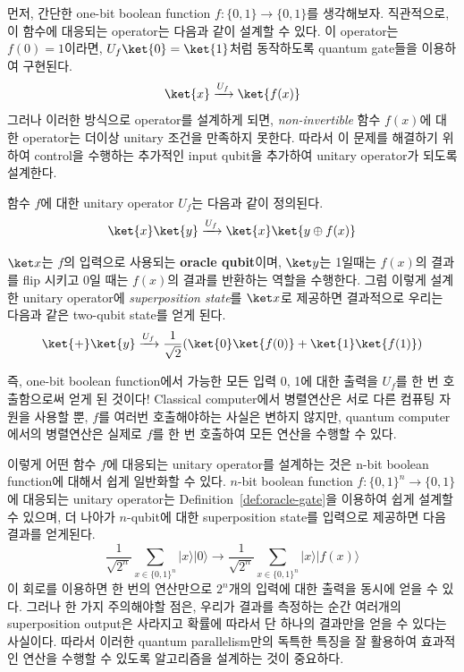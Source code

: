 먼저, 간단한 one-bit boolean function $f : \{0, 1\} \rightarrow \{0, 1\}$를 생각해보자.
직관적으로, 이 함수에 대응되는 operator는 다음과 같이 설계할 수 있다. 이 operator는 $f(0) = 1$이라면, $U_f\ket{0} = \ket{1}$처럼 동작하도록 quantum gate들을 이용하여 구현된다.
\begin{equation*}
  \ket{x} \xrightarrow{U_f} \ket{f(x)}
\end{equation*}
그러나 이러한 방식으로 operator를 설계하게 되면, \textit{non-invertible} 함수 $f(x)$에 대한 operator는 더이상 unitary 조건을 만족하지 못한다.
따라서 이 문제를 해결하기 위하여 control을 수행하는 추가적인 input qubit을 추가하여 unitary operator가 되도록 설계한다.
\begin{definition}\label{def:oracle-gate}
    함수 $f$에 대한 unitary operator $U_f$는 다음과 같이 정의된다.
    \begin{equation*}
      \ket{x}\ket{y} \xrightarrow{U_f} \ket{x}\ket{y \oplus f(x)}
    \end{equation*}
\end{definition}

\newpage 

$\ket x$는 $f$의 입력으로 사용되는 \textbf{oracle qubit}이며, $\ket y$는 1일때는 $f(x)$의 결과를 flip 시키고 0일 때는 $f(x)$의 결과를 반환하는 역할을 수행한다.
그럼 이렇게 설계한 unitary operator에 \textit{superposition state}를 $\ket x$로 제공하면 결과적으로 우리는 다음과 같은 two-qubit state를 얻게 된다.
\begin{equation*}
  \ket{+}\ket{y} \xrightarrow{U_f} \frac{1}{\sqrt 2} (\ket{0}\ket{f(0)} + \ket{1} \ket{f(1)})
\end{equation*}

즉, one-bit boolean function에서 가능한 모든 입력 0, 1에 대한 출력을 $U_f$를 한 번 호출함으로써 얻게 된 것이다!
Classical computer에서 병렬연산은 서로 다른 컴퓨팅 자원을 사용할 뿐, $f$를 여러번 호출해야하는 사실은 변하지 않지만, quantum computer에서의 병렬연산은 실제로 $f$를 한 번 호출하여 모든 연산을 수행할 수 있다.

이렇게 어떤 함수 $f$에 대응되는 unitary operator를 설계하는 것은 n-bit boolean function에 대해서 쉽게 일반화할 수 있다.
$n$-bit boolean function $f: \{0, 1\}^n \rightarrow \{0, 1\}$에 대응되는 unitary operator는 Definition~\ref{def:oracle-gate}을 이용하여 쉽게 설계할 수 있으며, 더 나아가 $n$-qubit에 대한 superposition state를 입력으로 제공하면 다음 결과를 얻게된다.
\begin{equation*}
  \frac{1}{\sqrt{2^n}} \sum_{x \in\{0,1\}^n}|x\rangle|0\rangle \rightarrow \frac{1}{\sqrt{2^n}} \sum_{x \in\{0,1\}^n}|x\rangle|f(x)\rangle
\end{equation*}
이 회로를 이용하면 한 번의 연산만으로 $2^n$개의 입력에 대한 출력을 동시에 얻을 수 있다.
그러나 한 가지 주의해야할 점은, 우리가 결과를 측정하는 순간 여러개의 superposition output은 사라지고 확률에 따라서 단 하나의 결과만을 얻을 수 있다는 사실이다. 
따라서 이러한 quantum parallelism만의 독특한 특징을 잘 활용하여 효과적인 연산을 수행할 수 있도록 알고리즘을 설계하는 것이 중요하다.

